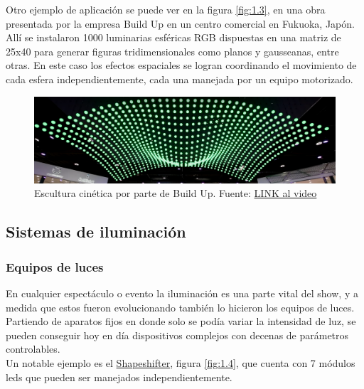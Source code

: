Otro ejemplo de aplicación se puede ver en la figura \ref{fig:1.3}, en una obra presentada por la empresa Build Up en un centro comercial en Fukuoka, Japón. Allí se instalaron 1000 luminarias esféricas RGB dispuestas en una matriz de 25x40 para generar figuras tridimensionales como planos y gausseanas, entre otras. En este caso los efectos espaciales se logran coordinando el movimiento de cada esfera independientemente, cada una manejada por un equipo motorizado.
\begin{figure}[!ht]
	\centering
	\includegraphics[width=15cm,scale=1]{resources/1_3-kinSculp.png}
	\caption{ Escultura cinética por parte de Build Up. Fuente: \href{https://www.youtube.com/watch?v=ICixCazf6-k}{LINK al video} }
	\label{fig:\thefigure}
\end{figure}



\subsection{Sistemas de iluminación}
\subsubsection{Equipos de luces}
En cualquier espectáculo o evento la iluminación es una parte vital del show, y a medida que estos fueron evolucionando también lo hicieron los equipos de luces. Partiendo de aparatos fijos en donde solo se podía variar la intensidad de luz, se pueden conseguir hoy en día dispositivos complejos con decenas de parámetros controlables.\\
Un notable ejemplo es el \href{http://preworks.at/index.php/en/products/led-automated-luminairies/shapeshifter}{Shapeshifter}, figura \ref{fig:1.4}, que cuenta con 7 módulos leds que pueden ser manejados independientemente.

